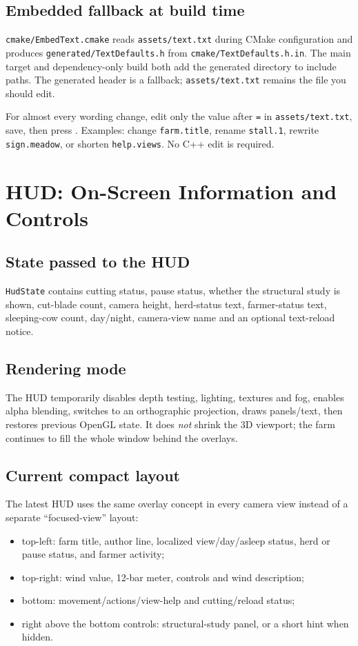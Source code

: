 \documentclass[11pt,a4paper,openany]{book}
\newcommand{\code}[1]{\texttt{#1}}
\newcommand{\file}[1]{\nolinkurl{#1}}
\newcommand{\keycap}[1]{\begingroup\setlength{\fboxsep}{0.8pt}\raisebox{0.05ex}{\fbox{\footnotesize\texttt{#1}}}\endgroup}
\begin{document}
\section{Embedded fallback at build time}
\file{cmake/EmbedText.cmake} reads \file{assets/text.txt} during CMake configuration and produces \file{generated/TextDefaults.h} from \file{cmake/TextDefaults.h.in}. The main target and dependency-only build both add the generated directory to include paths. The generated header is a fallback; \file{assets/text.txt} remains the file you should edit.

\begin{editbox}
	For almost every wording change, edit only the value after \code{=} in \file{assets/text.txt}, save, then press \keycap{F9}. Examples: change \code{farm.title}, rename \code{stall.1}, rewrite \code{sign.meadow}, or shorten \code{help.views}. No C++ edit is required.
\end{editbox}

\chapter{HUD: On-Screen Information and Controls}
\section{State passed to the HUD}
\code{HudState} contains cutting status, pause status, whether the structural study is shown, cut-blade count, camera height, herd-status text, farmer-status text, sleeping-cow count, day/night, camera-view name and an optional text-reload notice.

\section{Rendering mode}
The HUD temporarily disables depth testing, lighting, textures and fog, enables alpha blending, switches to an orthographic projection, draws panels/text, then restores previous OpenGL state. It does \emph{not} shrink the 3D viewport; the farm continues to fill the whole window behind the overlays.

\section{Current compact layout}
The latest HUD uses the same overlay concept in every camera view instead of a separate ``focused-view'' layout:
\begin{itemize}
	\item top-left: farm title, author line, localized view/day/asleep status, herd or pause status, and farmer activity;
	\item top-right: wind value, 12-bar meter, controls and wind description;
	\item bottom: movement/actions/view-help and cutting/reload status;
	\item right above the bottom controls: structural-study panel, or a short \keycap{B} hint when hidden.
\end{itemize}
\end{document}

